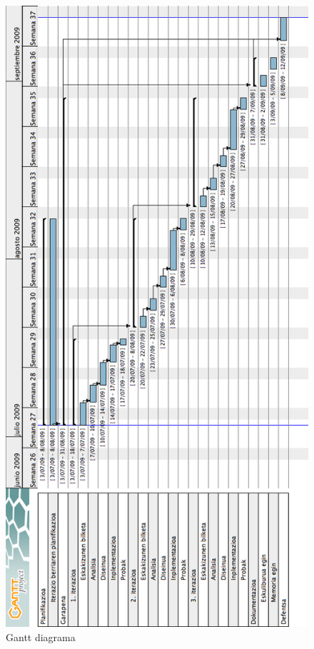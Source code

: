 \begin{figure}[htp]
\begin{center}
\includegraphics[scale=0.5]{Pictures/Chapter3/Gantt-txikia.png}
\caption{Gantt diagrama}
\label{gantt.txikia}
\end{center}
\end{figure}

